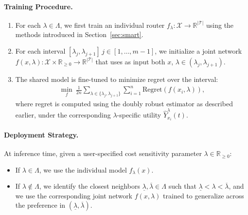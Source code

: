 \documentclass{article}
\theoremstyle{remark}
\begin{document}
\paragraph{Training Procedure.} %
\begin{enumerate}[leftmargin=1.5em]
    \item %
    For each $\lambda \in \Lambda$, we first train an individual router $f_\lambda : \mathcal{X} \to \mathbb{R}^{|\mathcal{T}|}$ using the methods introduced in Section~\ref{sec:smart}.
    \item %
    For each interval $[\lambda_j, \lambda_{j+1}]\, j \in [1,\dots,m-1]$,  we initialize a joint network $f(x, \lambda): \mathcal{X} \times \mathbb{R}_{\geq0} \to \mathbb{R}^{|\mathcal{T}|}$ that uses as input both $x$, $\lambda \in (\lambda_j, \lambda_{j+1})$.
    \item The shared model is fine-tuned to minimize regret over the interval:
    \begin{align}
        \min_f \ \frac{1}{2n} \sum_{\lambda \in \{\lambda_j, \lambda_{j+1}\}} \sum_{i=1}^n \text{Regret}\left(f(x_i, \lambda)\right),
    \end{align}
    where regret is computed using the doubly robust estimator as described earlier, under the corresponding $\lambda$-specific utility $\hat{Y}_{x_i}^{\lambda}(t)$.
\end{enumerate}

\paragraph{Deployment Strategy.} At inference time, given a user-specified cost sensitivity parameter $\lambda \in \mathbb{R}_{\geq 0}$:
\begin{itemize}[leftmargin=1.5em]
    \item If $\lambda \in \Lambda$, we use the individual model $f_{\lambda}(x)$.
    \item If $\lambda \notin \Lambda$, we identify the closest neighbors $\underline{\lambda}, \overline{\lambda} \in \Lambda$ such that $\underline{\lambda} < \lambda < \overline{\lambda}$, and we use the corresponding joint network $f(x, \lambda)$ trained to generalize across the preference in $(\underline{\lambda}, \overline{\lambda} )$.
\end{itemize}

\end{document}
